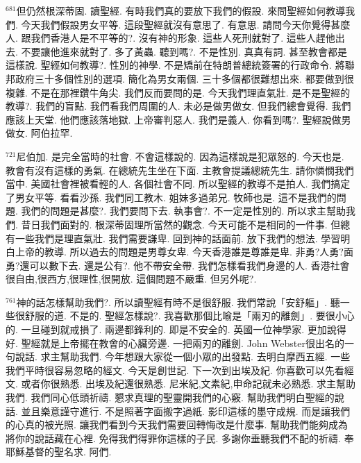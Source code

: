 \documentclass{book}
\begin{document}
$^{681}$但仍然根深蒂固.
讀聖經.
有時我們真的要放下我們的假設.
來問聖經如何教導我們.
今天我們假設男女平等.
這段聖經就沒有意思了.
有意思.
請問今天你覺得甚麼人.
跟我們香港人是不平等的?.
沒有神的形象.
這些人死刑就對了.
這些人趕他出去.
不要讓他進來就對了.
多了黃蟲.
聽到嗎?.
不是性別.
真真有詞.
甚至教會都是這樣說.
聖經如何教導?.
性別的神學.
不是矯前在特朗普總統簽署的行政命令.
將聯邦政府三十多個性別的選項.
簡化為男女兩個.
三十多個都很難想出來.
都要做到很複雜.
不是在那裡鑽牛角尖.
我們反而要問的是.
今天我們理直氣壯.
是不是聖經的教導?.
我們的盲點.
我們看我們周圍的人.
未必是做男做女.
但我們總會覺得.
我們應該上天堂.
他們應該落地獄.
上帝審判惡人.
我們是義人.
你看到嗎?.
聖經說做男做女.
阿伯拉罕.

$^{721}$尼伯加.
是完全當時的社會.
不會這樣說的.
因為這樣說是犯眾怒的.
今天也是.
教會有沒有這樣的勇氣.
在總統先生坐在下面.
主教會提議總統先生.
請你憐憫我們當中.
美國社會裡被看輕的人.
各個社會不同.
所以聖經的教導不是拍人.
我們搞定了男女平等.
看看沙孫.
我們同工教木.
姐妹多過弟兄.
牧師也是.
這不是我們的問題.
我們的問題是甚麼?.
我們要問下去.
執事會?.
不一定是性別的.
所以求主幫助我們.
昔日我們面對的.
根深蒂固理所當然的觀念.
今天可能不是相同的一件事.
但總有一些我們是理直氣壯.
我們需要謙卑.
回到神的話面前.
放下我們的想法.
學習明白上帝的教導.
所以過去的問題是男尊女卑.
今天香港誰是尊誰是卑.
非勇?人勇?面勇?還可以數下去.
還是公有?.
他不帶安全帶.
我們怎樣看我們身邊的人.
香港社會很自由,很西方,很理性,很開放.
這個問題不嚴重.
但另外呢?.

$^{761}$神的話怎樣幫助我們?.
所以讀聖經有時不是很舒服.
我們常說「安舒軀」.
聽一些很舒服的道.
不是的.
聖經怎樣說?.
我喜歡那個比喻是「兩刃的離劍」.
要很小心的.
一旦碰到就戒損了.
兩邊都鋒利的.
即是不安全的.
英國一位神學家.
更加說得好.
聖經就是上帝擺在教會的心臟旁邊.
一把兩刃的離劍.
John Webster很出名的一句說話.
求主幫助我們.
今年想跟大家從一個小眾的出發點.
去明白摩西五經.
一些我們平時很容易忽略的經文.
今天是創世記.
下一次到出埃及紀.
你喜歡可以先看經文.
或者你很熟悉.
出埃及紀還很熟悉.
尼米紀,文素紀,申命記就未必熟悉.
求主幫助我們.
我們同心低頭祈禱.
懇求真理的聖靈開我們的心竅.
幫助我們明白聖經的說話.
並且樂意謹守進行.
不是照著字面搬字過紙.
影印這樣的墨守成規.
而是讓我們的心真的被光照.
讓我們看到今天我們需要回轉悔改是什麼事.
幫助我們能夠成為將你的說話藏在心裡.
免得我們得罪你這樣的子民.
多謝你垂聽我們不配的祈禱.
奉耶穌基督的聖名求.
阿們.

\newpage
\end{document}
